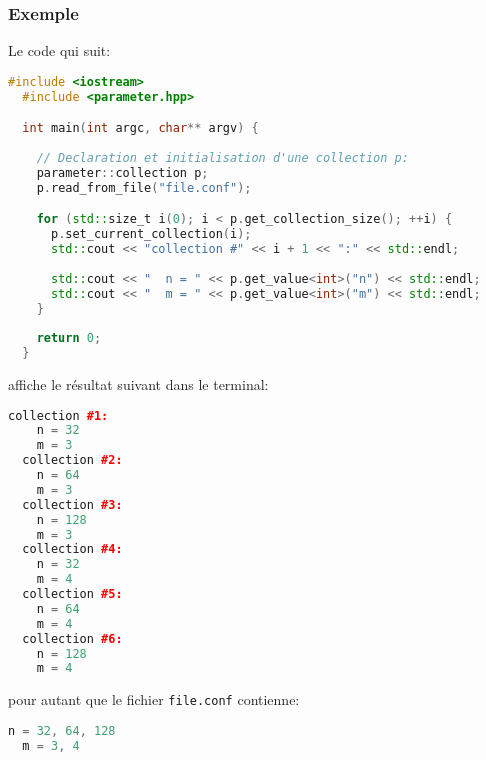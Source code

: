 \subsubsection{Exemple}

Le code qui suit:
\begin{lstlisting}[language=c++,frame=single,basicstyle=\ttfamily\footnotesize]
  #include <iostream>
  #include <parameter.hpp> 

  int main(int argc, char** argv) {
   
    // Declaration et initialisation d'une collection p:
    parameter::collection p;
    p.read_from_file("file.conf");

    for (std::size_t i(0); i < p.get_collection_size(); ++i) {
      p.set_current_collection(i);
      std::cout << "collection #" << i + 1 << ":" << std::endl;
      
      std::cout << "  n = " << p.get_value<int>("n") << std::endl;
      std::cout << "  m = " << p.get_value<int>("m") << std::endl;
    }
    
    return 0;
  }
\end{lstlisting}
affiche le r\'esultat suivant dans le terminal:
\begin{lstlisting}[language=c++,frame=single,basicstyle=\ttfamily\footnotesize]
  collection #1:
    n = 32
    m = 3
  collection #2:
    n = 64
    m = 3
  collection #3:
    n = 128
    m = 3
  collection #4:
    n = 32
    m = 4
  collection #5:
    n = 64
    m = 4
  collection #6:
    n = 128
    m = 4
\end{lstlisting}
pour autant que le fichier \texttt{file.conf} contienne:
\begin{lstlisting}[language=c++,frame=single,basicstyle=\ttfamily\footnotesize]
  n = 32, 64, 128
  m = 3, 4
\end{lstlisting}
